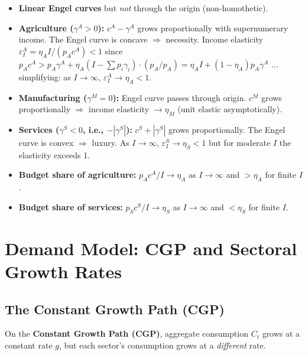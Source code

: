 \documentclass[a4paper,11pt]{article}
\begin{document}
\begin{resultbox}
\begin{itemize}[nosep]
    \item \textbf{Linear Engel curves} but \emph{not} through the origin (non-homothetic).
    \item \textbf{Agriculture ($\gamma^A > 0$):} $c^A - \gamma^A$ grows proportionally with supernumerary income. The Engel curve is concave $\Rightarrow$ necessity. Income elasticity $\varepsilon_I^A = \eta_A I / (p_A c^A) < 1$ since $p_A c^A > p_A \gamma^A + \eta_A(I - \sum p_i \gamma_i) \cdot (p_A/p_A) = \eta_A I + (1-\eta_A) p_A \gamma^A$ ... simplifying: as $I \to \infty$, $\varepsilon_I^A \to \eta_A < 1$.
    \item \textbf{Manufacturing ($\gamma^M = 0$):} Engel curve passes through origin. $c^M$ grows proportionally $\Rightarrow$ income elasticity $\to \eta_M$ (unit elastic asymptotically).
    \item \textbf{Services ($\gamma^S < 0$, i.e., $-|\gamma^S|$):} $c^S + |\gamma^S|$ grows proportionally. The Engel curve is convex $\Rightarrow$ luxury. As $I \to \infty$, $\varepsilon_I^S \to \eta_S < 1$ but for moderate $I$ the elasticity exceeds 1.
    \item \textbf{Budget share of agriculture:} $p_A c^A / I \to \eta_A$ as $I \to \infty$ and $> \eta_A$ for finite $I$.
    \item \textbf{Budget share of services:} $p_S c^S / I \to \eta_S$ as $I \to \infty$ and $< \eta_S$ for finite $I$.
\end{itemize}
\end{resultbox}

\clearpage

\section{Demand Model: CGP and Sectoral Growth Rates}

\subsection*{The Constant Growth Path (CGP)}

On the \textbf{Constant Growth Path (CGP)}, aggregate consumption $C_t$ grows at a constant rate $g$, but each sector's consumption grows at a \emph{different} rate.
\end{document}
